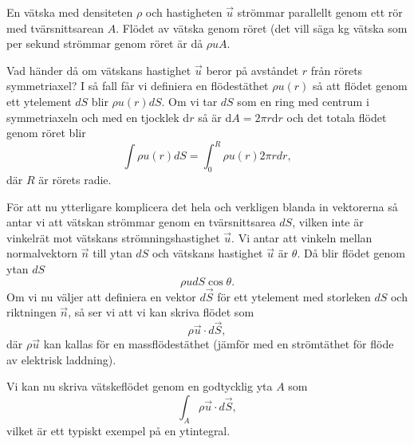 \documentclass[%
oneside,                 %
final,                   %
10pt]{article}
\newenvironment{notice_mdfboxadmon}[1][]{
\begin{notice_mdfboxmdframed}[frametitle=#1]
}
{
\end{notice_mdfboxmdframed}
}
\begin{document}
\begin{notice_mdfboxadmon}

En vätska med densiteten $\rho$ och hastigheten $\vec{u}$ strömmar parallellt genom ett rör med tvärsnittsarean $A$.  Flödet av vätska genom röret (det vill säga kg vätska som per sekund strömmar genom röret är då $\rho u A$.  

Vad händer då om vätskans  hastighet $\vec{u}$ beror på avståndet $r$ från rörets symmetriaxel?  I så fall får vi definiera en flödestäthet $\rho u(r)$ så att flödet genom ett ytelement $dS$ blir $\rho u(r)dS$. Om vi tar $dS$ som en ring med centrum i symmetriaxeln och med en tjocklek d$r$ så är d$A = 2\pi r$d$r$ och det totala flödet genom röret blir
\begin{equation}
  \int \rho u( r ) dS = \int_0^R \rho u ( r ) 2 \pi r
dr,
\end{equation}
där $R$ är rörets radie.

För att nu ytterligare komplicera det hela och verkligen blanda in vektorerna så antar vi att vätskan strömmar genom en tvärsnittsarea $dS$, vilken inte är vinkelrät mot vätskans strömningshastighet $\vec{u}$.  Vi antar att vinkeln mellan normalvektorn $\vec{n}$ till ytan $dS$ och vätskans hastighet $\vec{u}$ är $\theta$.  Då blir flödet genom ytan $dS$
\begin{equation}
  \rho u dS \cos \theta.
\end{equation}
Om vi nu väljer att definiera en vektor $d\vec{S}$ för ett ytelement med storleken $dS$ och riktningen $\vec{n}$, så ser vi att vi kan skriva flödet som
\begin{equation}
  \rho \vec{u} \cdot d\vec{S},
\end{equation}
där $\rho \vec{u}$ kan kallas för en massflödestäthet (jämför med en strömtäthet för flöde av elektrisk laddning).

Vi kan nu skriva vätskeflödet genom en godtycklig yta $A$ som
\begin{equation}
  \int_A \rho \vec{u} \cdot d\vec{S},
\end{equation}
vilket är ett typiskt exempel på en ytintegral.
\end{notice_mdfboxadmon} %
\end{document}
